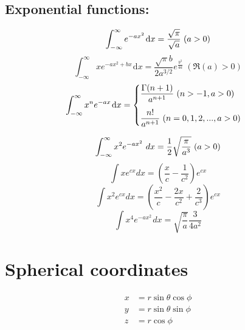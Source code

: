 \documentclass[12pt,a4paper]{article}
\begin{document}
	
	\subsection*{Exponential functions:}

		
		
		
		
		\begin{equation}
			\int_{-\infty}^\infty e^{-ax^2}\hspace{1pt}\text{d}x = \frac{\sqrt{\pi}}{\sqrt{a}} \hspace*{3pt}(a > 0)
		\end{equation}
		\begin{equation}
			\int_{-\infty}^\infty x e^{-ax^2 + bx}\hspace{1pt}\text{d}x = \frac{\sqrt{\pi} b}{2a^{3/2}} e^{\frac{b^2}{4a}} \hspace{3pt}(\Re(a) > 0)
		\end{equation}
		\begin{equation}
			\int_{-\infty}^\infty x^n e^{-ax} \hspace{1pt} \text{d}x = \begin{cases}
				\dfrac{\Gamma (n+1)}{a^{n+1}} \hspace*{3pt} (n>-1, a>0)\\[.15in]
				\dfrac{n!}{a^{n+1}} \hspace*{3pt} (n=0,1,2,..., a>0)
			\end{cases}
		\end{equation}
		
		\begin{equation}
			\int_{-\infty}^\infty x^2 e^{-ax^2}\ {dx} = \frac{1}{2} \sqrt{\frac{\pi}{a^3}} \hspace*{3pt} (a > 0)
		\end{equation}
		\begin{equation}
			\int x e^{cx} dx = \left(\frac{x}{c}-\frac{1}{c^2}\right) e^{cx}
		\end{equation}
		\begin{equation}
			\int x^2 e^{cx} dx = \left(\frac{x^2}{c} - \frac{2x}{c^2} + \frac{2}{c^3}\right) e^{cx}
		\end{equation}
		\begin{equation}
			\int x^4 e^{-ax^2}\hspace{1pt} dx = \sqrt{\dfrac{\pi }{a}} \dfrac{3}{4a^2}
		\end{equation}
		
	\section*{Spherical coordinates}
	\begin{align*}
		x &= r \sin \theta \cos \phi \\
		y &= r \sin \theta \sin \phi \\
		z &= r \cos \phi
	\end{align*}
	
\end{document}
